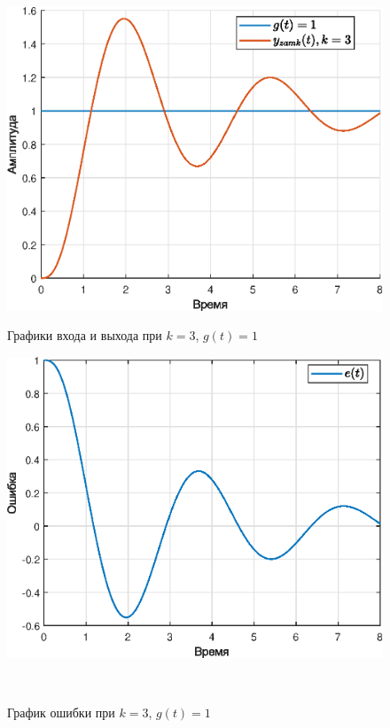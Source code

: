 \documentclass[a4paper]{article}
\begin{document}
\begin{figure}[H]
    \begin{minipage}{0.5\textwidth}
        \centering \includegraphics[width=\textwidth]{ex4/k3_g_a.eps}
        \caption{Графики входа и выхода при $k=3$, $g(t)=1$}
    \end{minipage}\hfill
    \begin{minipage}{0.5\textwidth}
        \centering \includegraphics[width=\textwidth]{ex4/k3_g_a_error.eps}
        \caption{График ошибки при $k=3$, $g(t)=1$}
    \end{minipage}\\[1em]
\end{figure}\noindent\
\end{document}
